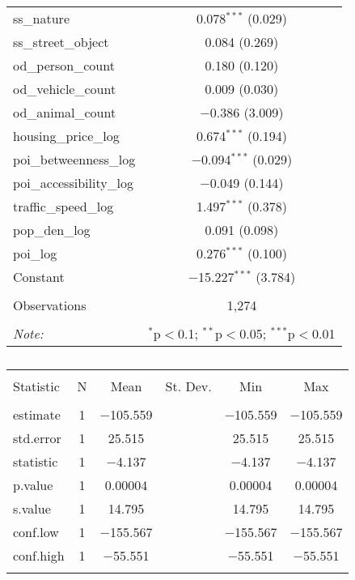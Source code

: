 \begin{table}[!htbp]
\begin{tabular}{@{\extracolsep{1pt}}lc}
  ss\_nature & 0.078$^{***}$ (0.029) \\ 
  ss\_street\_object & 0.084 (0.269) \\ 
  od\_person\_count & 0.180 (0.120) \\ 
  od\_vehicle\_count & 0.009 (0.030) \\ 
  od\_animal\_count & $-$0.386 (3.009) \\ 
  housing\_price\_log & 0.674$^{***}$ (0.194) \\ 
  poi\_betweenness\_log & $-$0.094$^{***}$ (0.029) \\ 
  poi\_accessibility\_log & $-$0.049 (0.144) \\ 
  traffic\_speed\_log & 1.497$^{***}$ (0.378) \\ 
  pop\_den\_log & 0.091 (0.098) \\ 
  poi\_log & 0.276$^{***}$ (0.100) \\ 
  Constant & $-$15.227$^{***}$ (3.784) \\ 
 \hline \\[-1.8ex] 
Observations & 1,274 \\ 
\hline 
\hline \\[-1.8ex] 
\textit{Note:}  & \multicolumn{1}{r}{$^{*}$p$<$0.1; $^{**}$p$<$0.05; $^{***}$p$<$0.01} \\ 
\end{tabular} 
\end{table} 

\begin{table}[!htbp] \centering 
  \caption{} 
  \label{} 
\small 
\begin{tabular}{@{\extracolsep{1pt}}lccccc} 
\\[-1.8ex]\hline 
\hline \\[-1.8ex] 
Statistic & \multicolumn{1}{c}{N} & \multicolumn{1}{c}{Mean} & \multicolumn{1}{c}{St. Dev.} & \multicolumn{1}{c}{Min} & \multicolumn{1}{c}{Max} \\ 
\hline \\[-1.8ex] 
estimate & 1 & $-$105.559 &  & $-$105.559 & $-$105.559 \\ 
std.error & 1 & 25.515 &  & 25.515 & 25.515 \\ 
statistic & 1 & $-$4.137 &  & $-$4.137 & $-$4.137 \\ 
p.value & 1 & 0.00004 &  & 0.00004 & 0.00004 \\ 
s.value & 1 & 14.795 &  & 14.795 & 14.795 \\ 
conf.low & 1 & $-$155.567 &  & $-$155.567 & $-$155.567 \\ 
conf.high & 1 & $-$55.551 &  & $-$55.551 & $-$55.551 \\ 
\hline \\[-1.8ex] 
\end{tabular} 
\end{table} 

